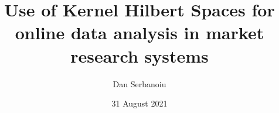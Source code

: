 

\title{Use of Kernel Hilbert Spaces for online data analysis in market research systems} 
\author{Dan Serbanoiu} 
\date{31 August 2021} 



\maketitle



\begin{singlespace}

\tableofcontents
\cleardoublepage
\listoffigures
\cleardoublepage

\end{singlespace}
 


\nopagebreak





\nocite{orwell46,adair1997,eisenberg1992,gowers2004,Pfeiffer1998,Ritter2003,Strunk2000,Truss2003,vanemden1998,vanemden2001,vanemden1996,bailey2006,cone-and-foster-1993,seliger1989,emacs-begin,handbook}


\begin{singlespace}
\raggedright

\end{singlespace}

\appendix
 